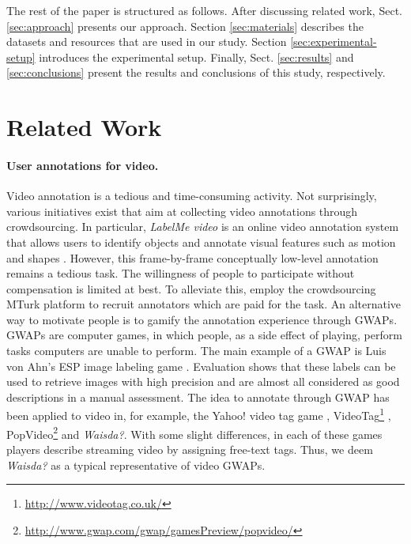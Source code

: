 The rest of the paper is structured as follows.  After discussing related work, Sect. \ref{sec:approach} presents our approach. 
Section \ref{sec:materials} describes the datasets and resources that are used in our study. 
Section \ref{sec:experimental-setup} introduces the experimental setup. Finally, Sect. \ref{sec:results} and \ref{sec:conclusions} present the results and conclusions of this study, respectively.

\section{Related Work}\label{sec:related-work}
\paragraph{User annotations for video.}Video annotation is a tedious and time-consuming activity. Not surprisingly, various initiatives exist that aim at collecting video annotations through crowdsourcing. In particular, \textit{LabelMe video} is an online video annotation system that allows users to identify objects and annotate visual features such as motion and shapes \cite{labelme}. However, this frame-by-frame conceptually low-level annotation remains a tedious task. The willingness of people to participate without compensation is limited at best. To alleviate this, \cite{turk1,turk2} employ the crowdsourcing MTurk platform to recruit annotators which are paid for the task. An alternative way to motivate people is to gamify the annotation experience through GWAPs. GWAPs are computer games, in which people, as a side effect of playing, perform tasks computers are unable to perform. The main example of a GWAP is Luis von Ahn's ESP image labeling game \cite{CHI2004:vonAhn}. Evaluation shows that these labels can be used to retrieve images with high precision and are almost all considered as good descriptions in a manual assessment. The idea to annotate through GWAP has been applied to video in, for example, the Yahoo! video tag game \cite{WWW08_vanZwol_etal}, VideoTag\footnote{\url{http://www.videotag.co.uk/}} , PopVideo\footnote{\url{http://www.gwap.com/gwap/gamesPreview/popvideo/}} and \textit{Waisda?}. With some slight differences, in each of these games players describe streaming video by assigning free-text tags. Thus, we deem \textit{Waisda?} as a typical representative of video GWAPs. 

